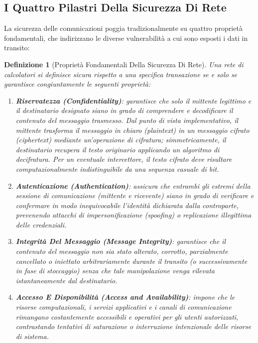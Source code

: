 \documentclass[11pt, a4paper]{article}
\newtheorem{theorem}{Definizione}
\begin{document}
\subsection{I Quattro Pilastri Della Sicurezza Di Rete}

La sicurezza delle comunicazioni poggia tradizionalmente su quattro proprietà fondamentali, che indirizzano le diverse vulnerabilità a cui sono esposti i dati in transito:

\begin{theorem}[Proprietà Fondamentali Della Sicurezza Di Rete]
Una rete di calcolatori si definisce sicura rispetto a una specifica transazione se e solo se garantisce congiuntamente le seguenti proprietà:
\begin{enumerate}[leftmargin=*]
    \item \textbf{Riservatezza (\emph{Confidentiality})}: garantisce che solo il mittente legittimo e il destinatario designato siano in grado di comprendere e decodificare il contenuto del messaggio trasmesso. Dal punto di vista implementativo, il mittente trasforma il messaggio in chiaro (\emph{plaintext}) in un messaggio cifrato (\emph{ciphertext}) mediante un'operazione di cifratura; simmetricamente, il destinatario recupera il testo originario applicando un algoritmo di decifratura. Per un eventuale intercettore, il testo cifrato deve risultare computazionalmente indistinguibile da una sequenza casuale di bit.
    \item \textbf{Autenticazione (\emph{Authentication})}: assicura che entrambi gli estremi della sessione di comunicazione (mittente e ricevente) siano in grado di verificare e confermare in modo inequivocabile l'identità dichiarata dalla controparte, prevenendo attacchi di impersonificazione (\emph{spoofing}) o replicazione illegittima delle credenziali.
    \item \textbf{Integrità Del Messaggio (\emph{Message Integrity})}: garantisce che il contenuto del messaggio non sia stato alterato, corrotto, parzialmente cancellato o iniettato arbitrariamente durante il transito (o successivamente in fase di stoccaggio) senza che tale manipolazione venga rilevata istantaneamente dal destinatario.
    \item \textbf{Accesso E Disponibilità (\emph{Access and Availability})}: impone che le risorse computazionali, i servizi applicativi e i canali di comunicazione rimangano costantemente accessibili e operativi per gli utenti autorizzati, contrastando tentativi di saturazione o interruzione intenzionale delle risorse di sistema.
\end{enumerate}
\end{theorem}
\end{document}
